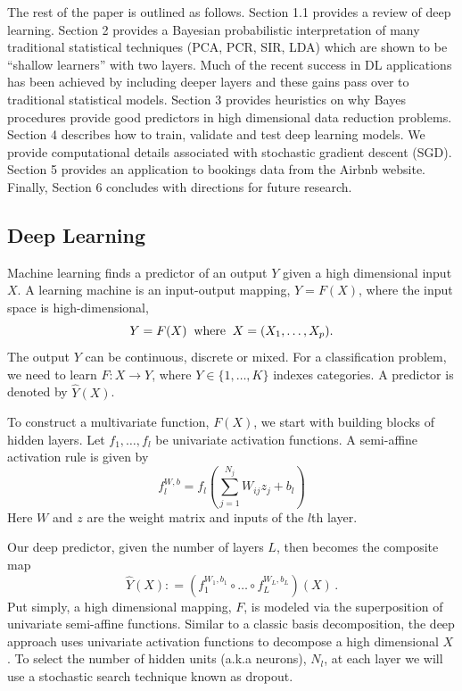 \documentclass[12pt]{article}
\newcommand{\defeq}{\mathrel{\mathop:}=}
\begin{document}
The rest of the paper is outlined as follows. Section 1.1 provides a review of deep learning. Section 2 provides a Bayesian probabilistic interpretation of many traditional statistical techniques (PCA, PCR, SIR, LDA) which are shown to be ``shallow learners'' with two layers.
Much of the recent success in DL applications has been achieved by including deeper layers and these gains pass over to traditional statistical models. Section 3 provides heuristics on why Bayes procedures provide good predictors in high dimensional data reduction problems.
Section 4 describes how to train, validate and test deep learning models. We provide computational details associated with stochastic gradient descent (SGD).
Section 5 provides an application to bookings data from the Airbnb website.  Finally, Section 6 concludes with directions for future research.


\subsection{Deep Learning}
Machine learning finds a predictor of an output $Y$ given a high dimensional input $X$. A learning machine is an input-output mapping, $Y= F(X)$, where the input space is high-dimensional,
$$
Y = F(X ) \; \; {\rm where} \; \; X = ( X_1 , \ldots , X_p ).
$$
The output $Y$ can be continuous, discrete or mixed.
For a classification problem, we need to learn $ F :X \rightarrow Y$, where $Y \in \{ 1 , \ldots , K \} $ indexes categories. A predictor is denoted by $ \hat{Y}(X)$.

To construct a multivariate function, $F(X)$, we start with building blocks of hidden layers.
Let $f_1,\ldots,f_l$ be univariate activation functions. A  semi-affine activation rule is given by
\[
f_l^{W,b} = f_l\left(\sum_{j=1}^{N_j}W_{ij}z_j + b_l\right) %
\]
Here $W$ and $z$ are the weight matrix and inputs of the $l$th layer. 

Our deep predictor, given the number of layers $L$, then becomes the composite map
\begin{equation*}
\hat{Y}(X) \defeq \left ( f_1^{W_1,b_1} \circ \ldots \circ f_L^{W_L,b_L} \right ) ( X)\,.\label{DLComp}
\end{equation*}
Put simply, a high dimensional mapping, $F$, is modeled via the superposition of univariate semi-affine functions. Similar to a classic basis decomposition, the deep approach uses univariate activation functions to decompose a high dimensional $X$. To select the number of hidden units (a.k.a neurons), $N_l$, at each layer we will use a stochastic search technique known as dropout.
\end{document}
